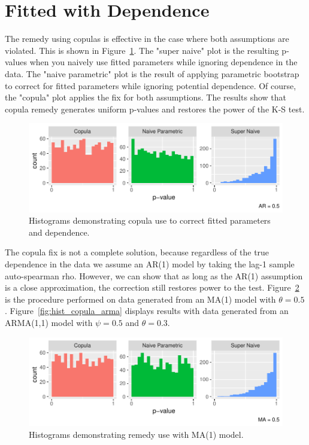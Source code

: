 \documentclass[12pt, letterpaper, titlepage]{article}
\begin{document}
\hypertarget{sec:fittedwithdependence}{%
\section{Fitted with Dependence}\label{sec:fittedwithdependence}}

The remedy using copulas is effective in the case where both assumptions are violated.
This is shown in Figure~\ref{fig:hist_copula}. The "super naive" plot is the resulting 
p-values when you naively use fitted parameters while ignoring dependence in the data.
The "naive parametric" plot is the result of applying parametric bootstrap to correct
for fitted parameters while ignoring potential dependence. Of course, the "copula" 
plot applies the fix for both assumptions. The results show that copula remedy generates 
uniform p-values and restores the power of the K-S test.

\begin{figure}[tbp]
  \centering
  \includegraphics{hist_copula}
  \caption{Histograms demonstrating copula use to correct fitted parameters and dependence.}
  \label{fig:hist_copula}
\end{figure}

The copula fix is not a complete solution, because regardless of the true dependence in the data
we assume an AR(1) model by taking the lag-1 sample auto-spearman rho. However, we can 
show that as long as the AR(1) assumption is a close approximation, the correction still restores power to the test.
Figure~\ref{fig:hist_copula_ma1} is the procedure performed on data generated from 
an MA(1) model with $\theta = 0.5$. Figure~\ref{fig:hist_copula_arma} displays results with 
data generated from an ARMA(1,1) model with $\psi = 0.5$ and $\theta = 0.3$. 

\begin{figure}[tbp]
  \centering
  \includegraphics{hist_copula_ma1}
  \caption{Histograms demonstrating remedy use with MA(1) model.}
  \label{fig:hist_copula_ma1}
\end{figure}
\end{document}
